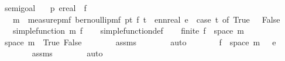 \begin{isabellebody}
%
\endisadelimproof
\isanewline
\isanewline
{}\isamarkupfalse%
\ semi{\isacharunderscore}{\kern0pt}goal{}{}{\isacharcolon}{\kern0pt}\isanewline
\ \ \ p{}\ e{\isacharcolon}{\kern0pt}{\isacharcolon}{\kern0pt}real\ \ f\isanewline
\ \ \ {\isachardoublequoteopen}m\ {\isacharequal}{\kern0pt}\ measure{\isacharunderscore}{\kern0pt}pmf\ {\isacharparenleft}{\kern0pt}bernoulli{\isacharunderscore}{\kern0pt}pmf\ p{}{\isacharparenright}{\kern0pt}{\isachardoublequoteclose}{\isachardoublequoteopen}{\isasymAnd}t{\isachardot}{\kern0pt}\ f\ t\ {\isacharequal}{\kern0pt}\ ennreal\ e\ {\isacharasterisk}{\kern0pt}\ {\isacharparenleft}{\kern0pt}case\ t\ of\ True\ {\isasymRightarrow}\ {}{\isacharbar}{\kern0pt}\ False\ {\isasymRightarrow}\ {}{\isacharparenright}{\kern0pt}{\isachardoublequoteclose}\isanewline
\ \ \ {\isachardoublequoteopen}simple{\isacharunderscore}{\kern0pt}function\ m\ f{\isachardoublequoteclose}\isanewline
%
\isadelimproof
\ \ %
\endisadelimproof
%
\isatagproof
{}\isamarkupfalse%
\ simple{\isacharunderscore}{\kern0pt}function{\isacharunderscore}{\kern0pt}def\isanewline
{}\isamarkupfalse%
\isanewline
\ \ \isamarkupfalse%
\ {\isachardoublequoteopen}finite\ {\isacharparenleft}{\kern0pt}f\ {\isacharbackquote}{\kern0pt}\ space\ m{\isacharparenright}{\kern0pt}{\isachardoublequoteclose}\isanewline
\ \ \isamarkupfalse%
{\isacharminus}{\kern0pt}\isanewline
\ \ \ \ \isamarkupfalse%
\ {\isachardoublequoteopen}space\ m\ {\isacharequal}{\kern0pt}\ {\isacharbraceleft}{\kern0pt}True{\isacharcomma}{\kern0pt}\ False{\isacharbraceright}{\kern0pt}{\isachardoublequoteclose}\isanewline
\ \ \ \ \ \ \isamarkupfalse%
\ assms{\isacharparenleft}{\kern0pt}{}{\isacharparenright}{\kern0pt}\isanewline
\ \ \ \ \ \ \isamarkupfalse%
\ auto\isanewline
\ \ \ \ \isamarkupfalse%
\ \isamarkupfalse%
\ {\isachardoublequoteopen}f\ {\isacharbackquote}{\kern0pt}\ space\ m\ {\isacharequal}{\kern0pt}\ {\isacharbraceleft}{\kern0pt}{}{\isacharcomma}{\kern0pt}\ e{\isacharbraceright}{\kern0pt}{\isachardoublequoteclose}\isanewline
\ \ \ \ \ \ \isamarkupfalse%
\ assms{\isacharparenleft}{\kern0pt}{}{\isacharparenright}{\kern0pt}\isanewline
\ \ \ \ \ \ \isamarkupfalse%
\ auto\isanewline
\ \ \ \ \isamarkupfalse%
\ \isamarkupfalse%

\end{isabellebody}

